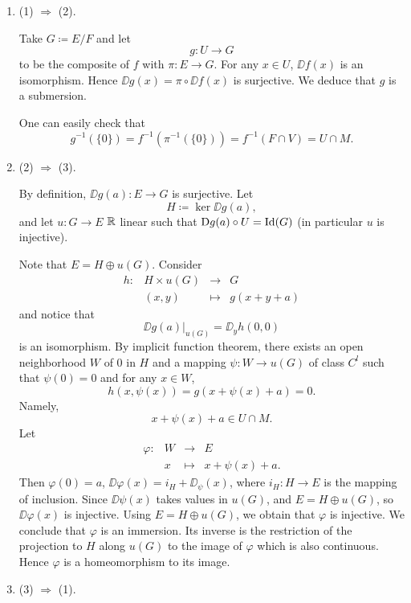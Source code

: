 \begin{proofenv}
    \quad
    \begin{enumerate}[label=\roman*.]
        \item (1) $\Rightarrow$ (2).
            
            Take $G \coloneq E/F$ and let
            $$g : U \longrightarrow G$$
            to be the composite of $f$ with $\pi : E \longrightarrow G$.
            For any $x \in U$, $\DD f(x)$ is an isomorphism.
            Hence $\DD g(x) = \pi \circ \DD f (x)$ is surjective.
            We deduce that $g$ is a submersion.

            \quad One can easily check that
            $$g^{-1}(\{0\}) = f^{-1}\left(\pi^{-1}(\{0\})\right) = f^{-1} \left(F \cap V\right) = U \cap M.$$
        \item (2) $\Rightarrow$ (3).

            By definition, $\DD g(a) : E \longrightarrow G$ is surjective.
            Let $$H \coloneq \ker \DD g(a),$$ and let $u : G \longrightarrow E$ $\mathbb{R}$ linear such that $\mathrm{D} g(a) \circ U = \operatorname{\mathrm{Id}}(G)$ (in particular $u$ is injective).
            
            \quad Note that $E = H \oplus u(G)$.
            Consider
            $$\begin{array}{rrcl}
                h : & H \times u(G) & \longrightarrow & G\\
                & (x,y) & \longmapsto & g (x + y + a)
            \end{array}$$
            and notice that
            $$\DD g(a) |_{u(G)} = \DD_y h(0,0)$$
            is an isomorphism.
            By implicit function theorem, there exists an open neighborhood $W$ of $0$ in $H$ and a mapping $\psi : W \longrightarrow u(G)$ of class $C^l$ such that
            $\psi(0) = 0$ and for any $x \in W$,
            $$h(x,\psi(x)) = g(x + \psi(x) + a) = 0.$$
            Namely,
            $$x + \psi(x) + a \in U \cap M.$$
            Let
            $$\begin{array}{rrcl}
                \varphi : & W & \longrightarrow & E\\
                & x & \longmapsto & x + \psi(x) + a.
            \end{array}$$
            Then $\varphi(0) = a$, $\DD \varphi(x) = i_{H} + \DD_{\psi}(x)$,
            where $i_H : H \longrightarrow E$ is the mapping of inclusion.
            Since $\DD \psi (x)$ takes values in $u(G)$, and $E = H \oplus u(G)$, so $\DD \varphi (x)$ is injective.
            Using $E = H \oplus u(G)$, we obtain that $\varphi$ is injective.
            We conclude that $\varphi$ is an immersion.
            Its inverse is the restriction of the projection to $H$ along $u(G)$ to the image of $\varphi$ which is also continuous.
            Hence $\varphi$ is a homeomorphism to its image.
        \item (3) $\Rightarrow$ (1).


\end{enumerate}
\end{proofenv}

